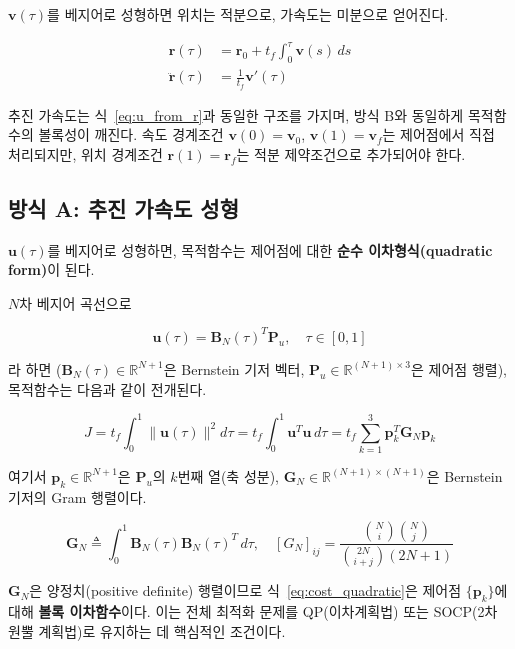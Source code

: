 \documentclass[11pt]{article}
\begin{document}
$\mathbf{v}(\tau)$를 베지어로 성형하면 위치는 적분으로,
가속도는 미분으로 얻어진다.

\begin{align}
  \mathbf{r}(\tau) &= \mathbf{r}_0 + t_f \int_0^\tau \mathbf{v}(s)\,ds \\
  \ddot{\mathbf{r}}(\tau) &= \frac{1}{t_f}\mathbf{v}'(\tau)
\end{align}

추진 가속도는 식~\eqref{eq:u_from_r}과 동일한 구조를 가지며,
방식 B와 동일하게 목적함수의 볼록성이 깨진다.
속도 경계조건 $\mathbf{v}(0) = \mathbf{v}_0$, $\mathbf{v}(1) = \mathbf{v}_f$는
제어점에서 직접 처리되지만,
위치 경계조건 $\mathbf{r}(1) = \mathbf{r}_f$는 적분 제약조건으로 추가되어야 한다.

\subsection{방식 A: 추진 가속도 성형}

$\mathbf{u}(\tau)$를 베지어로 성형하면, 목적함수는 제어점에 대한
\textbf{순수 이차형식(quadratic form)}이 된다.

$N$차 베지어 곡선으로

\begin{equation}
  \mathbf{u}(\tau) = \mathbf{B}_N(\tau)^T \mathbf{P}_u, \quad \tau \in [0,1]
  \label{eq:u_bezier}
\end{equation}

라 하면 ($\mathbf{B}_N(\tau) \in \mathbb{R}^{N+1}$은 Bernstein 기저 벡터,
$\mathbf{P}_u \in \mathbb{R}^{(N+1)\times 3}$은 제어점 행렬), 목적함수는 다음과 같이 전개된다.

\begin{equation}
  J = t_f \int_0^1 \|\mathbf{u}(\tau)\|^2 d\tau
  = t_f \int_0^1 \mathbf{u}^T \mathbf{u}\, d\tau
  = t_f \sum_{k=1}^{3} \mathbf{p}_k^T \mathbf{G}_N \mathbf{p}_k
  \label{eq:cost_quadratic}
\end{equation}

여기서 $\mathbf{p}_k \in \mathbb{R}^{N+1}$은 $\mathbf{P}_u$의 $k$번째 열(축 성분),
$\mathbf{G}_N \in \mathbb{R}^{(N+1)\times(N+1)}$은 Bernstein 기저의 Gram 행렬이다.

\begin{equation}
  \mathbf{G}_N \triangleq \int_0^1 \mathbf{B}_N(\tau)\mathbf{B}_N(\tau)^T \, d\tau, \quad
  [G_N]_{ij} = \frac{\binom{N}{i}\binom{N}{j}}{\binom{2N}{i+j}(2N+1)}
  \label{eq:gram_matrix}
\end{equation}

$\mathbf{G}_N$은 양정치(positive definite) 행렬이므로 식~\eqref{eq:cost_quadratic}은
제어점 $\{\mathbf{p}_k\}$에 대해 \textbf{볼록 이차함수}이다.
이는 전체 최적화 문제를 QP(이차계획법) 또는 SOCP(2차 원뿔 계획법)로
유지하는 데 핵심적인 조건이다.
\end{document}
